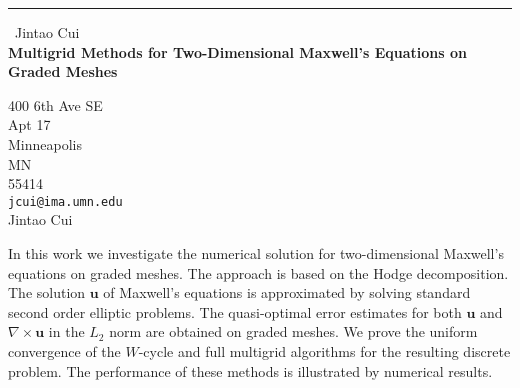 \documentclass{report}
\begin{document}
\begin{center}
\rule{6in}{1pt} \
{\large Jintao Cui \\
{\bf Multigrid Methods for Two-Dimensional Maxwell's Equations on Graded Meshes}}

400 6th Ave SE \\ Apt 17 \\ Minneapolis \\ MN \\ 55414
\\
{\tt jcui@ima.umn.edu}\\
Jintao Cui\end{center}

In this work we investigate the numerical solution for two-dimensional
Maxwell's equations on graded meshes. The approach is based on the Hodge
decomposition. The solution $\boldsymbol{u}$ of Maxwell's equations is
approximated by solving standard second order elliptic problems. The
quasi-optimal error estimates for both $\boldsymbol{u}$ and $\nabla
\times \boldsymbol{u}$ in the $L_2$ norm are obtained on graded meshes.
We prove the uniform convergence of the $W$-cycle and full multigrid
algorithms for the resulting discrete problem. The performance of these
methods is illustrated by numerical results.
\end{document}
